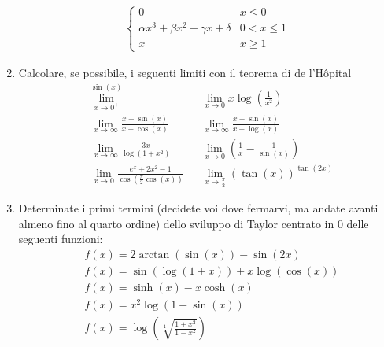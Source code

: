 \begin{enumerate}
\begin{align*}
\begin{cases}
			      0                                                 & x \le  0      \\
			      \alpha  x^3  + \beta  x ^2  +  \gamma  x + \delta & 0  < x \le  1 \\
			      x                                                 & x \ge  1
		      \end{cases}
	      \end{align*}
	\item Calcolare, se possibile, i seguenti limiti con il teorema di de l'Hôpital
	      \begin{align*}
		       & \lim_{x \to 0^{+}} ^{\sin \left(x\right)}                                                    &  & \lim_{x \to 0} x \log \left(\frac{1}{x^2 }\right)                                  \\
		       & \lim_{x \to \infty} \frac{x + \sin \left(x\right)}{x + \cos \left(x\right)}                  &  & \lim_{x \to \infty} \frac{x + \sin \left(x\right)}{x + \log \left(x\right)}        \\
		       & \lim_{x \to \infty} \frac{3x }{\log \left(1 + x^2 \right)}                                   &  & \lim_{x \to 0} \left(\frac{1}{x} - \frac{1}{\sin \left(x\right)}\right)            \\
		       & \lim_{x \to 0}  \frac{ e^{x} + 2x^2  -1}{\cos \left(\frac{\pi}{2}\cos \left(x\right)\right)} &  & \lim_{x \to \frac{\pi}{2}} \left(\tan \left(x\right)\right)^{\tan \left(2x\right)}
	      \end{align*}
	\item Determinate i primi termini (decidete voi dove fermarvi, ma andate avanti almeno fino al quarto ordine) dello sviluppo di Taylor centrato in 0 delle seguenti funzioni:
	      \begin{align*}
		       & f\left(x\right) = 2\arctan \left(\sin \left(x\right)\right) - \sin \left(2x \right)                  \\
		       & f\left(x\right) = \sin \left(\log \left(1 +x\right)\right) + x \log \left(\cos \left(x\right)\right) \\
		       & f\left(x\right) = \sinh \left(x\right) - x \cosh \left(x\right)                                      \\
		       & f\left(x\right) = x^2  \log \left(1 + \sin \left(x\right)\right)                                     \\
		       & f\left(x\right) = \log \left(\sqrt[4]{\frac{1 + x^2 }{1 - x^2 }}\right)
	      \end{align*}

\end{enumerate}
